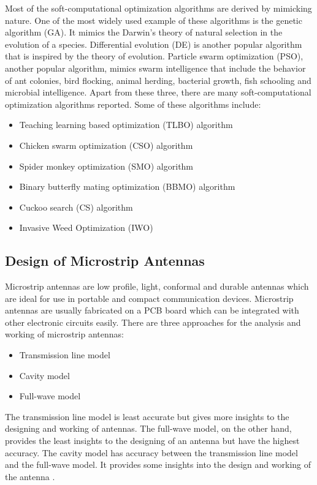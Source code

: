 Most of the soft-computational optimization algorithms are derived by mimicking nature. One of the most widely used example of these algorithms is the genetic algorithm (GA). It mimics the Darwin's theory of natural selection in the evolution of a species. Differential evolution (DE) is another popular algorithm that is inspired by the theory of evolution. Particle swarm optimization (PSO), another popular algorithm, mimics swarm intelligence that include the behavior of ant colonies, bird flocking, animal herding, bacterial growth, fish schooling and microbial intelligence. Apart from these three, there are many soft-computational optimization algorithms reported. Some of these algorithms include:
\begin{itemize}
\item Teaching learning based optimization (TLBO) algorithm \cite{arraySynth3}
\item Chicken swarm optimization (CSO) algorithm \cite{arraySynth4}
\item Spider monkey optimization (SMO) algorithm \cite{arrayThin1}
\item Binary butterfly mating optimization (BBMO) algorithm \cite{arrayThin2}
\item Cuckoo search (CS) algorithm \cite{CuckooSerach}
\item Invasive Weed Optimization (IWO) \cite{InvasiveWeed}
\end{itemize}

\subsection{Design of Microstrip Antennas}
Microstrip antennas are low profile, light, conformal and durable antennas which are ideal for use in portable and compact communication devices. Microstrip antennas are usually fabricated on a PCB board which can be integrated with other electronic circuits easily. There are three approaches for the analysis and working of microstrip antennas:
\begin{itemize}
\item Transmission line model
\item Cavity model
\item Full-wave model
\end{itemize}

The transmission line model is least accurate but gives more insights to the designing and working of antennas. The full-wave model, on the other hand, provides the least insights to the designing of an antenna but have the highest accuracy. The cavity model has accuracy between the transmission line model and the full-wave model. It provides some insights into the design and working of the antenna \cite{balanis}.

